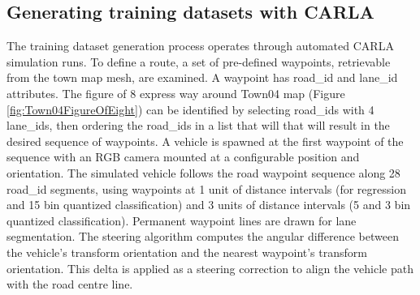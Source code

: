 
\subsection{Generating training datasets with CARLA}
\label{methods:carla_gen_train_datasets}
The training dataset generation process operates through automated CARLA simulation runs. To define a route, a set of pre-defined waypoints, retrievable from the town map mesh, are examined. A waypoint has road\_id and lane\_id attributes. The figure of 8 express way around Town04 map (Figure \ref{fig:Town04FigureOfEight}) can be identified by selecting road\_ids with 4 lane\_ids, then ordering the road\_ids in a list that will that will result in the desired sequence of waypoints. A vehicle is spawned at the first waypoint of the sequence with an RGB camera mounted at a configurable position and orientation.
The simulated vehicle follows the road waypoint sequence along 28 road\_id segments, using waypoints at 1 unit of distance intervals (for regression and 15 bin quantized classification) and 3 units of distance intervals (5 and 3 bin quantized classification). Permanent waypoint lines are drawn for lane segmentation. The steering algorithm computes the angular difference between the vehicle's transform orientation and the nearest waypoint's transform orientation. This delta is applied as a steering correction to align the vehicle path with the road centre line.


